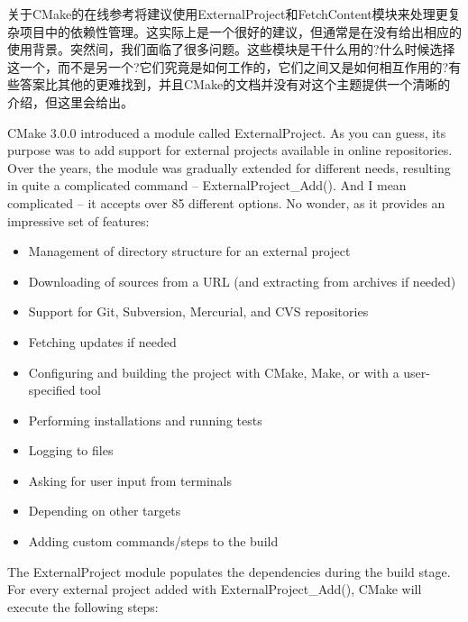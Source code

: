 
关于CMake的在线参考将建议使用ExternalProject和FetchContent模块来处理更复杂项目中的依赖性管理。这实际上是一个很好的建议，但通常是在没有给出相应的使用背景。突然间，我们面临了很多问题。这些模块是干什么用的?什么时候选择这一个，而不是另一个?它们究竟是如何工作的，它们之间又是如何相互作用的?有些答案比其他的更难找到，并且CMake的文档并没有对这个主题提供一个清晰的介绍，但这里会给出。


CMake 3.0.0 introduced a module called ExternalProject. As you can guess, its purpose was to add support for external projects available in online repositories. Over the years, the module was gradually extended for different needs, resulting in quite a complicated command – ExternalProject\_Add(). And I mean complicated – it accepts over 85 different options. No wonder, as it provides an impressive set of features:

\begin{itemize}
\item 
Management of directory structure for an external project

\item 
Downloading of sources from a URL (and extracting from archives if needed)

\item 
Support for Git, Subversion, Mercurial, and CVS repositories

\item 
Fetching updates if needed

\item 
Configuring and building the project with CMake, Make, or with a user-specified tool

\item 
Performing installations and running tests

\item 
Logging to files

\item 
Asking for user input from terminals

\item 
Depending on other targets

\item 
Adding custom commands/steps to the build
\end{itemize}

The ExternalProject module populates the dependencies during the build stage. For every external project added with ExternalProject\_Add(), CMake will execute the following steps:


